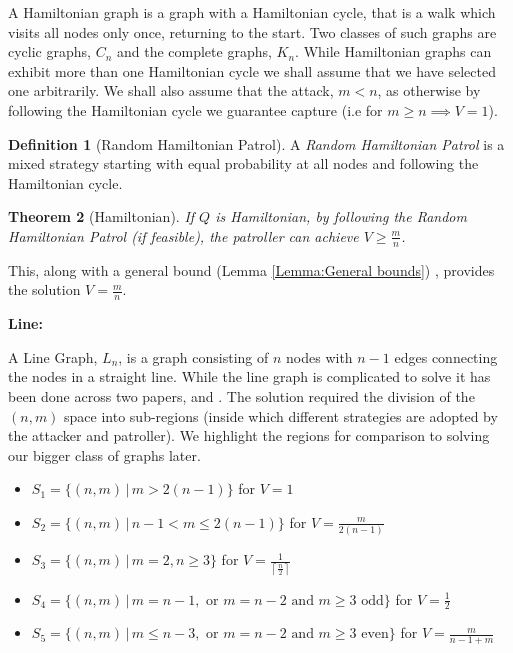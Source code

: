 \documentclass[a4paper,10pt]{article}
\newcommand{\ceil}[1]{\left \lceil #1 \right \rceil}
\newtheorem{theorem}{Theorem}[section]
\theoremstyle{definition}
\newtheorem{definition}[theorem]{Definition}
\theoremstyle{definition}
\theoremstyle{remark}
\theoremstyle{definition}
\begin{document}
A Hamiltonian graph is a graph with a Hamiltonian cycle, that is a walk which visits all nodes only once, returning to the start. Two classes of such graphs are cyclic graphs, $C_{n}$ and the complete graphs, $K_{n}$. While Hamiltonian graphs can exhibit more than one Hamiltonian cycle we shall assume that we have selected one arbitrarily. We shall also assume that the attack, $m < n$, as otherwise by following the Hamiltonian cycle we guarantee capture (i.e for $m \geq n \implies V=1$).

\begin{definition}[Random Hamiltonian Patrol]
A \textit{Random Hamiltonian Patrol} is a mixed strategy starting with equal probability at all nodes and following the Hamiltonian cycle.
\end{definition}

\begin{theorem}[Hamiltonian]
If $Q$ is Hamiltonian, by following the Random Hamiltonian Patrol (if feasible), the patroller can achieve $V \geq \frac{m}{n}$.
\end{theorem}

This, along with a general bound (Lemma \ref{Lemma:General bounds}) , provides the solution $V=\frac{m}{n}$.

\textbf{Line:}

A Line Graph, $L_{n}$, is a graph consisting of $n$ nodes with $n-1$ edges connecting the nodes in a straight line.  While the line graph is complicated to solve it has been done across two papers, \cite{Alpern2011} and \cite{Papadaki2016}. The solution required the division of the $(n,m)$ space into sub-regions (inside which different strategies are adopted by the attacker and patroller). We highlight the regions for comparison to solving our bigger class of graphs later.

\begin{itemize}
\item $S_{1}= \{(n,m) \, | \, m > 2(n-1) \}$ for $V=1$
\item $S_{2}= \{(n,m) \, | \,  n-1 < m \leq 2(n-1) \}$ for $V=\frac{m}{2(n-1)}$
\item $S_{3}= \{(n,m) \, | \, m=2,n\geq 3 \}$ for $V=\frac{1}{\ceil{\frac{n}{2}}}$
\item $S_{4}= \{(n,m) \, | \, m=n-1, \text{ or } m=n-2 \text{ and } m \geq 3 \text{ odd} \}$ for $V=\frac{1}{2}$
\item $S_{5}= \{(n,m) \, | \, m \leq n-3, \text{ or } m=n-2 \text{ and } m \geq 3 \text{ even} \}$ for $V=\frac{m}{n-1+m}$
\end{itemize}
\end{document}
